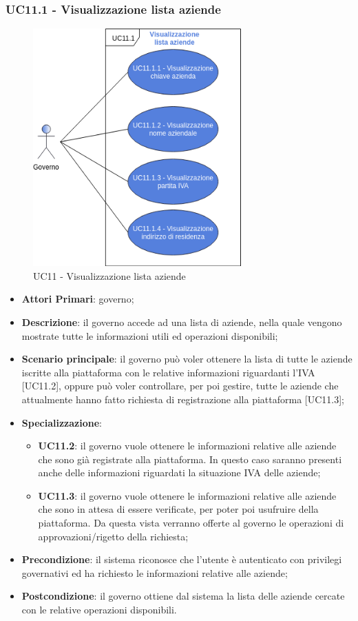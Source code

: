  \subsubsection{UC11.1 - Visualizzazione lista aziende}
 \begin{figure}[h]
 	\includegraphics[width=8cm]{res/images/UC11-1.png} 
 	\centering
 	\caption{UC11 - Visualizzazione lista aziende}
 	
 \end{figure}
 \begin{itemize}
 	\item \textbf{Attori Primari}: governo;
 	\item \textbf{Descrizione}: il governo accede ad una lista di aziende, nella quale vengono mostrate tutte le informazioni utili ed operazioni disponibili;
 	\item \textbf{Scenario principale}: il governo può voler ottenere la lista di tutte le aziende iscritte alla piattaforma con le relative informazioni riguardanti l'IVA [UC11.2], oppure può voler controllare, per poi gestire, tutte le aziende che attualmente hanno fatto richiesta di registrazione alla piattaforma [UC11.3]; 
	\item \textbf{Specializzazione}:
	\begin{itemize}
	 	\item \textbf{UC11.2}: il governo vuole ottenere le informazioni relative alle aziende che sono già registrate alla piattaforma. In questo caso saranno presenti anche delle informazioni riguardati la situazione IVA delle aziende;
	 	\item \textbf{UC11.3}: il governo vuole ottenere le informazioni relative alle aziende che sono in attesa di essere verificate, per poter poi usufruire della piattaforma. Da questa vista verranno offerte al governo le operazioni di approvazioni/rigetto della richiesta;
	\end{itemize}
 	\item \textbf{Precondizione}: il sistema riconosce che l'utente è autenticato con privilegi governativi ed ha richiesto le informazioni relative alle aziende;
 	\item \textbf{Postcondizione}: il governo ottiene dal sistema la lista delle aziende cercate con le relative operazioni disponibili.
\end{itemize}

